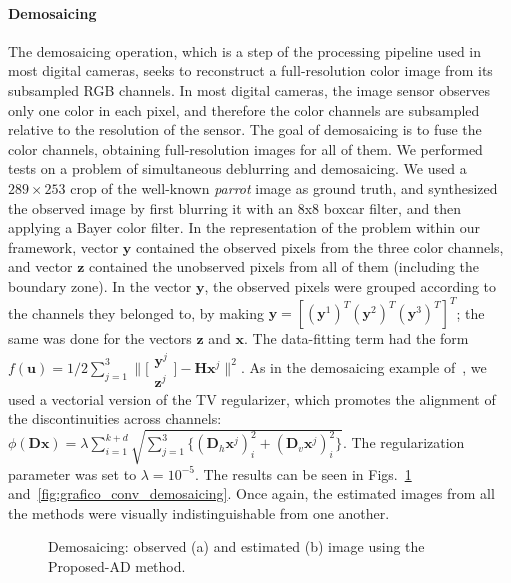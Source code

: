 \documentclass[10pt,twocolumn,twoside]{IEEEtran}
\newcommand{\Hm}{\mathbf{H}} %
\newcommand{\y}{\mathbf{y}} %
\newcommand{\x}{\mathbf{x}} %
\newcommand{\z}{\mathbf{z}} %
\newcommand{\D}{\mathbf{D}} %
\newcommand{\uu}{\mathbf{u}} %
\begin{document}
\paragraph{Demosaicing}  The demosaicing operation, which is a step of the processing pipeline used in most digital cameras, seeks to reconstruct a full-resolution color image from its subsampled RGB channels. In most digital cameras, the image sensor observes only one color in each pixel, and therefore the color channels are subsampled relative to the resolution of the sensor. The goal of demosaicing is to fuse the color channels, obtaining full-resolution images for all of them. We performed tests on a problem of simultaneous deblurring and demosaicing. We used a $289 \times 253$ crop of the well-known \emph{parrot} image as ground truth, and synthesized the observed image by first blurring it with an 8x8 boxcar filter, and then applying a Bayer color filter. In the representation of the problem within our framework, vector $\y$ contained the observed pixels from the three color channels, and vector $\z$ contained the unobserved pixels from all of them (including the boundary zone). In the vector $\y$, the observed pixels were grouped according to the channels they belonged to, by making $\y = [(\y^1)^T (\y^2)^T (\y^3)^T]^T$; the same was done for the vectors $\z$ and $\x$. The data-fitting term had the form $f(\uu) = 1/2 \sum_{j=1}^3 \big\| \big[ \begin{smallmatrix} \y^j \\ \z^j \end{smallmatrix} \big] - \Hm \x^j \big\|^2$. As in the demosaicing example of~\cite{Condat2014}, we used a vectorial version of the TV regularizer, which promotes the alignment of the discontinuities across channels: $\phi(\D \x) = \lambda \sum_{i=1}^{k+d} \sqrt{\sum_{j=1}^3 \{ (\D_h \x^j)_i^2 + (\D_v \x^j)_i^2 \}}$. The regularization parameter was set to $\lambda = 10^{-5}$. The results can be seen in Figs.~\ref{fig:parrot_demosaicing} and~\ref{fig:grafico_conv_demosaicing}. Once again, the estimated images from all the methods were visually indistinguishable from one another.

\begin{figure}[!t]
	\centering
	\hfil
	\caption{Demosaicing: observed (a) and estimated (b) image using the Proposed-AD method.}
	\label{fig:parrot_demosaicing}
\end{figure}
\end{document}
